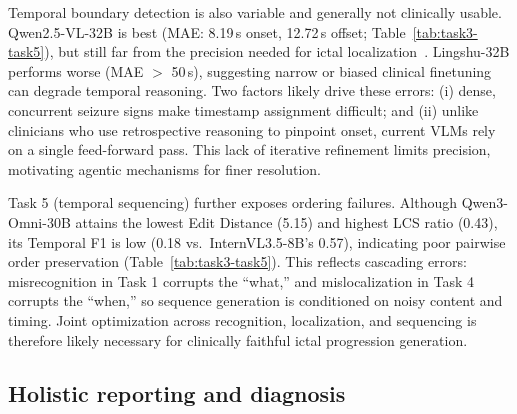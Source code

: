 \documentclass{article}
\theoremstyle{plain}
\theoremstyle{definition}
\theoremstyle{remark}
\begin{document}
Temporal boundary detection is also variable and generally not clinically usable. Qwen2.5-VL-32B is best (MAE: 8.19\,s onset, 12.72\,s offset; Table~\ref{tab:task3-task5}), but still far from the precision needed for ictal localization~\cite{shoeb2004patient}. Lingshu-32B performs worse (MAE $>$ 50\,s), suggesting narrow or biased clinical finetuning can degrade temporal reasoning. Two factors likely drive these errors: (i) dense, concurrent seizure signs make timestamp assignment difficult; and (ii) unlike clinicians who use retrospective reasoning to pinpoint onset, current VLMs rely on a single feed-forward pass. This lack of iterative refinement limits precision, motivating agentic mechanisms for finer resolution.

Task 5 (temporal sequencing) further exposes ordering failures. Although Qwen3-Omni-30B attains the lowest Edit Distance (5.15) and highest LCS ratio (0.43), its Temporal F1 is low (0.18 vs.\ InternVL3.5-8B’s 0.57), indicating poor pairwise order preservation (Table~\ref{tab:task3-task5}). This reflects cascading errors: misrecognition in Task 1 corrupts the “what,” and mislocalization in Task 4 corrupts the “when,” so sequence generation is conditioned on noisy content and timing. Joint optimization across recognition, localization, and sequencing is therefore likely necessary for clinically faithful ictal progression generation.




\subsection{Holistic reporting and diagnosis}
\end{document}
